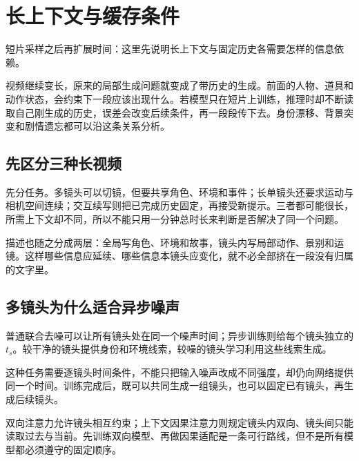 \chapter{长上下文与缓存条件}\label{seedance-m06}

短片采样之后再扩展时间：这里先说明长上下文与固定历史各需要怎样的信息依赖。

视频继续变长，原来的局部生成问题就变成了带历史的生成。前面的人物、道具和动作状态，会约束下一段应该出现什么。若模型只在短片上训练，推理时却不断读取自己刚生成的历史，误差会改变后续条件，再一段段传下去。身份漂移、背景突变和剧情遗忘都可以沿这条关系分析。

\section{先区分三种长视频}\label{seedance-m06-ux5148ux533aux5206ux4e09ux79cdux957fux89c6ux9891}

先分任务。多镜头可以切镜，但要共享角色、环境和事件；长单镜头还要求运动与相机空间连续；交互续写则把已完成历史固定，再接受新提示。三者都可能很长，所需上下文却不同，所以不能只用一分钟总时长来判断是否解决了同一个问题。

描述也随之分成两层：全局写角色、环境和故事，镜头内写局部动作、景别和运镜。这样哪些信息应延续、哪些信息本镜头应变化，就不必全部挤在一段没有归属的文字里。

\section{多镜头为什么适合异步噪声}\label{seedance-m06-ux591aux955cux5934ux4e3aux4ec0ux4e48ux9002ux5408ux5f02ux6b65ux566aux58f0}

普通联合去噪可以让所有镜头处在同一个噪声时间；异步训练则给每个镜头独立的 \(t_s\)。较干净的镜头提供身份和环境线索，较噪的镜头学习利用这些线索生成。

这种任务需要逐镜头时间条件，不能只把输入噪声改成不同强度，却仍向网络提供同一个时间。训练完成后，既可以共同生成一组镜头，也可以固定已有镜头，再生成后续镜头。

双向注意力允许镜头相互约束；上下文因果注意力则规定镜头内双向、镜头间只能读取过去与当前。先训练双向模型、再做因果适配是一条可行路线，但不是所有模型都必须遵守的固定顺序。

